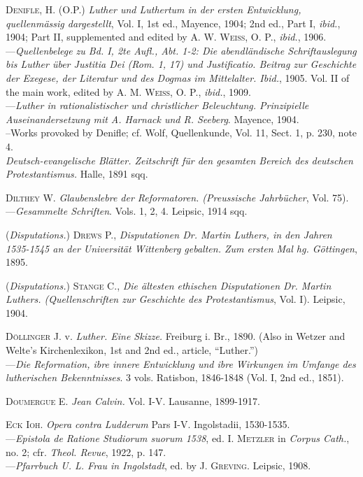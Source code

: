 \textsc{Denifle, H.} (O.P.) \textit{Luther und Luthertum in der ersten Entwicklung,
quellenmässig dargestellt}, Vol. I, 1st ed., Mayence, 1904; 2nd ed., Part I,
\textit{ibid.}, 1904; Part II, supplemented and edited by \textsc{A. W. Weiss, O. P.},
\textit{ibid.}, 1906.\\
---\textit{Quellenbelege zu Bd. I, 2te Aufl., Abt. 1-2: Die abendländische
Schriftauslegung bis Luther über Justitia Dei (Rom. 1, 17) und
Justificatio. Beitrag zur Geschichte der Exegese, der Literatur und des Dogmas
im Mittelalter. Ibid.}, 1905. Vol. II of the main work, edited by \textsc{A. M.
Weiss, O. P.}, \textit{ibid.}, 1909.\\
---\textit{Luther in rationalistischer und christlicher Beleuchtung. Prinzipielle
Auseinandersetzung mit A. Harnack und R. Seeberg}. Mayence, 1904.\\
--Works provoked by Denifle; cf. Wolf, Quellenkunde, Vol. 11, Sect. 1, p.
230, note 4.\\

\textit{Deutsch-evangelische Blätter. Zeitschrift für den gesamten Bereich des deutschen
Protestantismus.} Halle, 1891 sqq.

\textsc{Dilthey W.} \textit{Glaubenslebre der Reformatoren. (Preussische Jahrbücher}, Vol.
75). \\
---\textit{Gesammelte Schriften}. Vols. 1, 2, 4. Leipsic, 1914 sqq.

(\textit{Disputations.}) \textsc{Drews P.}, \textit{Disputationen Dr. Martin Luthers, in den
Jahren 1535-1545 an der Universität Wittenberg gebalten. Zum ersten
Mal hg. Göttingen}, 1895.

(\textit{Disputations.}) \textsc{Stange C.}, \textit{Die ältesten ethischen Disputationen Dr. Martin
Luthers. (Quellenschriften zur Geschichte des Protestantismus}, Vol. I).
Leipsic, 1904.

\textsc{Döllinger} J. v. \textit{Luther. Eine Skizze.} Freiburg i. Br., 1890. (Also in Wetzer
and Welte’s Kirchenlexikon, 1st and 2nd ed., article, “Luther.”) \\
---\textit{Die Reformation, ibre innere Entwicklung und ibre Wirkungen im
Umfange des lutherischen Bekenntnisses}. 3 vols. Ratisbon, 1846-1848 (Vol.
I, 2nd ed., 1851).

\textsc{Doumergue E.} \textit{Jean Calvin.} Vol. I-V. Lausanne, 1899-1917.

\textsc{Eck Ioh}. \textit{Opera contra Ludderum} Pars I-V. Ingolstadii, 1530-1535. \\
---\textit{Epistola de Ratione Studiorum suorum 1538}, ed. \textsc{I. Metzler} in \textit{Corpus
Cath.}, no. 2; cfr. \textit{Theol. Revue}, 1922, p. 147. \\
---\textit{Pfarrbuch U. L. Frau in Ingolstadt}, ed. by \textsc{J. Greving.} Leipsic, 1908.

